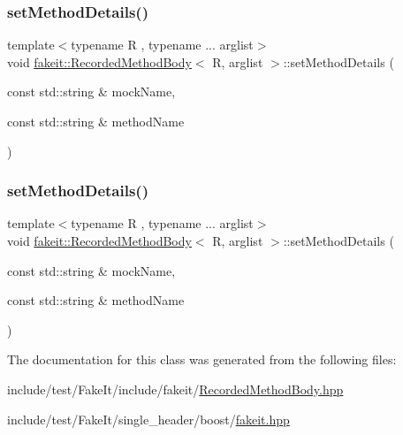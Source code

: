 \subsubsection{\texorpdfstring{setMethodDetails()}{setMethodDetails()}\hspace{0.1cm}{\footnotesize\ttfamily [8/9]}}
{\footnotesize\ttfamily template$<$typename R , typename ... arglist$>$ \\
void \mbox{\hyperlink{classfakeit_1_1RecordedMethodBody}{fakeit\+::\+Recorded\+Method\+Body}}$<$ R, arglist $>$\+::set\+Method\+Details (\begin{DoxyParamCaption}\item[{const std\+::string \&}]{mock\+Name,  }\item[{const std\+::string \&}]{method\+Name }\end{DoxyParamCaption})\hspace{0.3cm}{\ttfamily [inline]}}

\mbox{\label{classfakeit_1_1RecordedMethodBody_abd4ca14120d7a8b302b06e05148b523c}} 
\subsubsection{\texorpdfstring{setMethodDetails()}{setMethodDetails()}\hspace{0.1cm}{\footnotesize\ttfamily [9/9]}}
{\footnotesize\ttfamily template$<$typename R , typename ... arglist$>$ \\
void \mbox{\hyperlink{classfakeit_1_1RecordedMethodBody}{fakeit\+::\+Recorded\+Method\+Body}}$<$ R, arglist $>$\+::set\+Method\+Details (\begin{DoxyParamCaption}\item[{const std\+::string \&}]{mock\+Name,  }\item[{const std\+::string \&}]{method\+Name }\end{DoxyParamCaption})\hspace{0.3cm}{\ttfamily [inline]}}



The documentation for this class was generated from the following files\+:\begin{DoxyCompactItemize}
\item 
include/test/\+Fake\+It/include/fakeit/\mbox{\hyperlink{RecordedMethodBody_8hpp}{Recorded\+Method\+Body.\+hpp}}\item 
include/test/\+Fake\+It/single\+\_\+header/boost/\mbox{\hyperlink{single__header_2boost_2fakeit_8hpp}{fakeit.\+hpp}}\end{DoxyCompactItemize}
